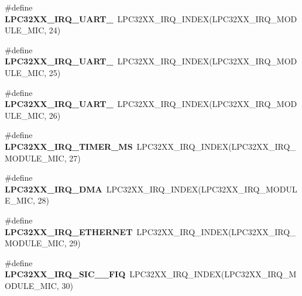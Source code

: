 \begin{DoxyCompactItemize}
\mbox{\label{group__lpc32xx__interrupt_gac348d07db713af77275f0680b87a2506}} 
\#define {\bfseries L\+P\+C32\+X\+X\+\_\+\+I\+R\+Q\+\_\+\+U\+A\+R\+T\+\_}~L\+P\+C32\+X\+X\+\_\+\+I\+R\+Q\+\_\+\+I\+N\+D\+EX(L\+P\+C32\+X\+X\+\_\+\+I\+R\+Q\+\_\+\+M\+O\+D\+U\+L\+E\+\_\+\+M\+IC, 24)
\item 
\mbox{\label{group__lpc32xx__interrupt_ga196cff49ee3b8c2f9488489e772daab3}} 
\#define {\bfseries L\+P\+C32\+X\+X\+\_\+\+I\+R\+Q\+\_\+\+U\+A\+R\+T\+\_}~L\+P\+C32\+X\+X\+\_\+\+I\+R\+Q\+\_\+\+I\+N\+D\+EX(L\+P\+C32\+X\+X\+\_\+\+I\+R\+Q\+\_\+\+M\+O\+D\+U\+L\+E\+\_\+\+M\+IC, 25)
\item 
\mbox{\label{group__lpc32xx__interrupt_ga6662f4b3f28f41c4347388de86984590}} 
\#define {\bfseries L\+P\+C32\+X\+X\+\_\+\+I\+R\+Q\+\_\+\+U\+A\+R\+T\+\_}~L\+P\+C32\+X\+X\+\_\+\+I\+R\+Q\+\_\+\+I\+N\+D\+EX(L\+P\+C32\+X\+X\+\_\+\+I\+R\+Q\+\_\+\+M\+O\+D\+U\+L\+E\+\_\+\+M\+IC, 26)
\item 
\mbox{\label{group__lpc32xx__interrupt_ga84933c0d45e18a355e0b17bcddcca1d1}} 
\#define {\bfseries L\+P\+C32\+X\+X\+\_\+\+I\+R\+Q\+\_\+\+T\+I\+M\+E\+R\+\_\+\+MS}~L\+P\+C32\+X\+X\+\_\+\+I\+R\+Q\+\_\+\+I\+N\+D\+EX(L\+P\+C32\+X\+X\+\_\+\+I\+R\+Q\+\_\+\+M\+O\+D\+U\+L\+E\+\_\+\+M\+IC, 27)
\item 
\mbox{\label{group__lpc32xx__interrupt_gaad2fe3d20f98ac8e9fd0c4f52c8cd491}} 
\#define {\bfseries L\+P\+C32\+X\+X\+\_\+\+I\+R\+Q\+\_\+\+D\+MA}~L\+P\+C32\+X\+X\+\_\+\+I\+R\+Q\+\_\+\+I\+N\+D\+EX(L\+P\+C32\+X\+X\+\_\+\+I\+R\+Q\+\_\+\+M\+O\+D\+U\+L\+E\+\_\+\+M\+IC, 28)
\item 
\mbox{\label{group__lpc32xx__interrupt_ga0bea230a04126fb27af9ab26dbf87c17}} 
\#define {\bfseries L\+P\+C32\+X\+X\+\_\+\+I\+R\+Q\+\_\+\+E\+T\+H\+E\+R\+N\+ET}~L\+P\+C32\+X\+X\+\_\+\+I\+R\+Q\+\_\+\+I\+N\+D\+EX(L\+P\+C32\+X\+X\+\_\+\+I\+R\+Q\+\_\+\+M\+O\+D\+U\+L\+E\+\_\+\+M\+IC, 29)
\item 
\mbox{\label{group__lpc32xx__interrupt_ga7d3c2fa3980a45f3455ba811883ed5c9}} 
\#define {\bfseries L\+P\+C32\+X\+X\+\_\+\+I\+R\+Q\+\_\+\+S\+I\+C\+\_\+\_\+\+F\+IQ}~L\+P\+C32\+X\+X\+\_\+\+I\+R\+Q\+\_\+\+I\+N\+D\+EX(L\+P\+C32\+X\+X\+\_\+\+I\+R\+Q\+\_\+\+M\+O\+D\+U\+L\+E\+\_\+\+M\+IC, 30)

\end{DoxyCompactItemize}
